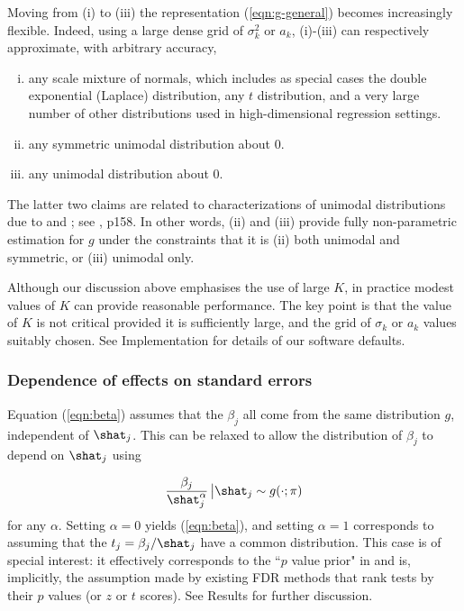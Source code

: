 Moving from (i) to (iii) the representation (\ref{eqn:g-general}) becomes increasingly flexible. Indeed,
using a large dense grid of $\sigma^2_k$ or $a_k$, (i)-(iii) can respectively approximate,
with arbitrary accuracy,

\begin{enumerate}
[(i)]
\item any scale mixture of normals, which includes as special cases
the double exponential (Laplace) distribution, any $t$ distribution, and a very large number of other distributions used in  high-dimensional regression settings.
\item any symmetric unimodal distribution about 0.
\item any unimodal distribution about 0.
\end{enumerate}
The latter two claims are related to characterizations of unimodal distributions due to \cite{khintchine1938unimodal} and  \cite{shepp1962symmetric}; see \cite{feller1971introduction}, p158. 
In other words, (ii) and (iii) provide fully non-parametric estimation for $g$ under the constraints that it is (ii) both unimodal and symmetric, or (iii) unimodal only.

Although our discussion above emphasises the use of large $K$, in practice modest values of $K$ can provide reasonable performance. 
The key point is that the value of $K$ is not critical provided it is sufficiently large, and the grid of $\sigma_k$ or $a_k$ values suitably chosen.
See Implementation for details of our software defaults.

\subsubsection*{Dependence of effects on standard errors}

Equation (\ref{eqn:beta}) assumes that the $\beta_j$ all come from the same distribution $g$, independent of $\shat_j$.
This can be relaxed to allow the distribution of $\beta_j$ to depend on $\shat_j$ using

\begin{equation}
\label{eqn:beta-alpha}
 \frac{\beta_j}{\shat_j^\alpha} \, \big |  \shat_j \sim g(\cdot; \pi)
 \end{equation}
for any $\alpha$. Setting $\alpha=0$ yields (\ref{eqn:beta}), and setting $\alpha=1$ corresponds to
assuming that the $t_j =\beta_j/ \shat_j$ have a common distribution. This case is of special interest:
it effectively corresponds to the ``$p$ value prior" in \cite{wakefield:2009} and is, implicitly, 
the assumption made by existing FDR methods that rank tests by their $p$ values (or $z$ or $t$ scores). See Results for further discussion.

